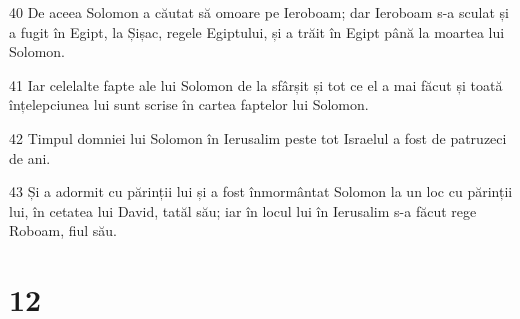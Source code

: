 \par 40 De aceea Solomon a căutat să omoare pe Ieroboam; dar Ieroboam s-a sculat și a fugit în Egipt, la Șișac, regele Egiptului, și a trăit în Egipt până la moartea lui Solomon.
\par 41 Iar celelalte fapte ale lui Solomon de la sfârșit și tot ce el a mai făcut și toată înțelepciunea lui sunt scrise în cartea faptelor lui Solomon.
\par 42 Timpul domniei lui Solomon în Ierusalim peste tot Israelul a fost de patruzeci de ani.
\par 43 Și a adormit cu părinții lui și a fost înmormântat Solomon la un loc cu părinții lui, în cetatea lui David, tatăl său; iar în locul lui în Ierusalim s-a făcut rege Roboam, fiul său.

\chapter{12}

